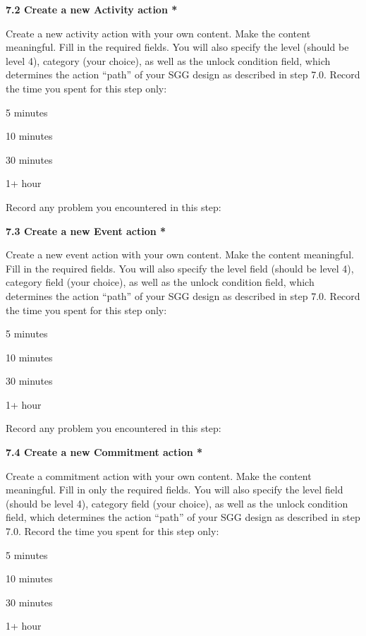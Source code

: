 {\bf 7.2 Create a new Activity action *}

Create a new activity action with your own content. Make the content meaningful. Fill in the required fields. You will also specify the level (should be level 4), category (your choice), as well as the unlock condition field, which determines the action ``path'' of your SGG design as described in step 7.0. Record the time you spent for this step only:

\begin{radiobutton}
\item 5 minutes
\item  10 minutes
\item  30 minutes
\item  1+ hour
\end{radiobutton}

Record any problem you encountered in this step: \underline{\hspace{4cm}}

{\bf 7.3 Create a new Event action *}

Create a new event action with your own content. Make the content meaningful. Fill in the required fields. You will also specify the level field (should be level 4), category field (your choice), as well as the unlock condition field, which determines the action ``path'' of your SGG design as described in step 7.0. Record the time you spent for this step only:

\begin{radiobutton}
\item 5 minutes
\item  10 minutes
\item  30 minutes
\item  1+ hour
\end{radiobutton}

Record any problem you encountered in this step: \underline{\hspace{4cm}}

{\bf 7.4 Create a new Commitment action *}

Create a commitment action with your own content. Make the content meaningful. Fill in only the required fields. You will also specify the level field (should be level 4), category field (your choice), as well as the unlock condition field, which determines the action ``path'' of your SGG design as described in step 7.0. Record the time you spent for this step only:

\begin{radiobutton}
\item 5 minutes
\item  10 minutes
\item  30 minutes
\item  1+ hour
\end{radiobutton}

